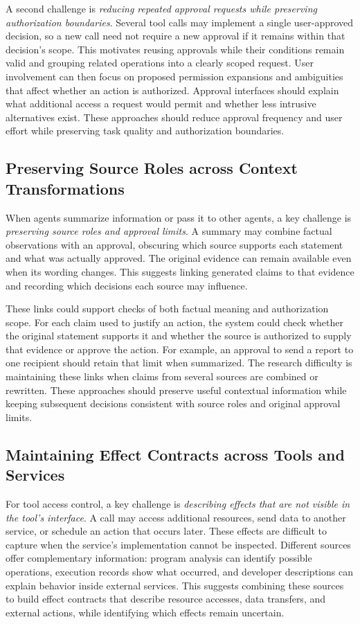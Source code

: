 A second challenge is \emph{reducing repeated approval requests while preserving authorization boundaries}. Several tool calls may implement a single user-approved decision, so a new call need not require a new approval if it remains within that decision's scope. This motivates reusing approvals while their conditions remain valid and grouping related operations into a clearly scoped request. User involvement can then focus on proposed permission expansions and ambiguities that affect whether an action is authorized. Approval interfaces should explain what additional access a request would permit and whether less intrusive alternatives exist. These approaches should reduce approval frequency and user effort while preserving task quality and authorization boundaries.

\subsection{Preserving Source Roles across Context Transformations}
When agents summarize information or pass it to other agents, a key challenge is \emph{preserving source roles and approval limits}. A summary may combine factual observations with an approval, obscuring which source supports each statement and what was actually approved. The original evidence can remain available even when its wording changes. This suggests linking generated claims to that evidence and recording which decisions each source may influence.

These links could support checks of both factual meaning and authorization scope. For each claim used to justify an action, the system could check whether the original statement supports it and whether the source is authorized to supply that evidence or approve the action. For example, an approval to send a report to one recipient should retain that limit when summarized. The research difficulty is maintaining these links when claims from several sources are combined or rewritten. These approaches should preserve useful contextual information while keeping subsequent decisions consistent with source roles and original approval limits.

\subsection{Maintaining Effect Contracts across Tools and Services}
For tool access control, a key challenge is \emph{describing effects that are not visible in the tool's interface}. A call may access additional resources, send data to another service, or schedule an action that occurs later. These effects are difficult to capture when the service's implementation cannot be inspected. Different sources offer complementary information: program analysis can identify possible operations, execution records show what occurred, and developer descriptions can explain behavior inside external services. This suggests combining these sources to build effect contracts that describe resource accesses, data transfers, and external actions, while identifying which effects remain uncertain.

